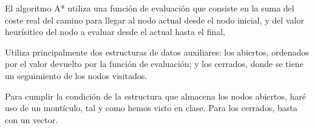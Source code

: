 El algoritmo A* utiliza una función de evaluación que consiste en la suma del coste real del camino para llegar al nodo actual desde el nodo inicial, y del valor heurísitico del nodo a evaluar desde el actual hasta el final, 

Utiliza principalmente dos estructuras de datos auxiliares: los abiertos, ordenados por el valor devuelto por la función de evaluación; y los cerrados, donde se tiene un seguimiento de los nodos visitados.

Para cumplir la condición de la estructura que almacena los nodos abiertos, haré uso de un montículo, tal y como hemos visto en clase. Para los cerrados, basta con un vector.